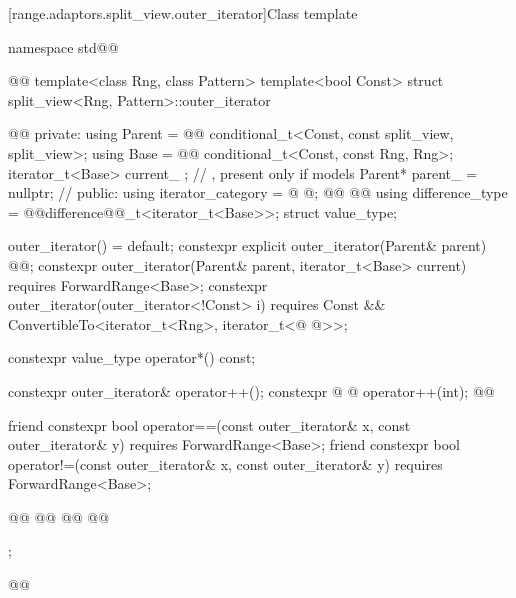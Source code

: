 {[range.adaptors.split_view.outer_iterator]{Class template }

\pnum
\begin{note}
\end{note}

\begin{codeblock}
namespace std@@ { @@
  template<class Rng, class Pattern>
  template<bool Const>
  struct split_view<Rng, Pattern>::outer_iterator { @\newtxt{// \expos}@
  private:
    using Parent =                @\newtxt{// \expos}@
      conditional_t<Const, const split_view, split_view>;
    using Base   =                @\newtxt{// \expos}@
      conditional_t<Const, const Rng, Rng>;
    iterator_t<Base> current_ {}; // \expos, present only if  models 
    Parent* parent_ = nullptr;    // \expos
  public:
    using iterator_category = @ \oldtxt{\seebelownc}@;
    @@
      @@
    using difference_type   = @@difference@@_t<iterator_t<Base>>;
    struct value_type;

    outer_iterator() = default;
    constexpr explicit outer_iterator(Parent& parent)
      @@;
    constexpr outer_iterator(Parent& parent, iterator_t<Base> current)
      requires ForwardRange<Base>;
    constexpr outer_iterator(outer_iterator<!Const> i) requires Const &&
      ConvertibleTo<iterator_t<Rng>, iterator_t<@ @>>;

    constexpr value_type operator*() const;

    constexpr outer_iterator& operator++();
    constexpr @ @ operator++(int);
    @@

    friend constexpr bool operator==(const outer_iterator& x, const outer_iterator& y)
      requires ForwardRange<Base>;
    friend constexpr bool operator!=(const outer_iterator& x, const outer_iterator& y)
      requires ForwardRange<Base>;

    @@
    @@
    @@
    @@
  };
}@\oldtxt{\}}@
\end{codeblock}

}
